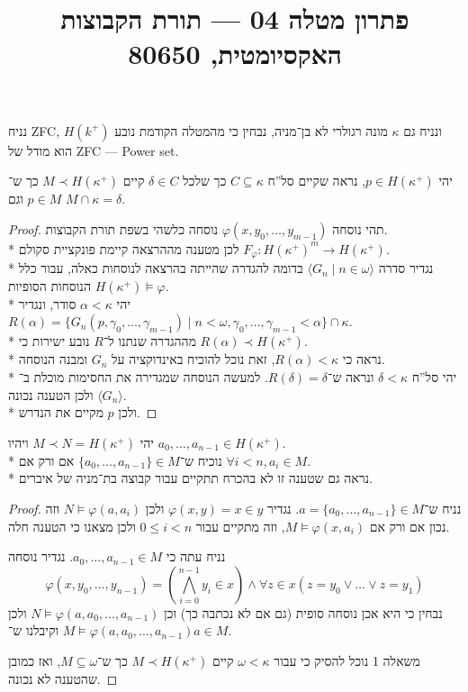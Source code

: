 
\title{פתרון מטלה 04 --- תורת הקבוצות האקסיומטית, 80650}

\DeclareMathOperator{\trcl}{trcl}
\DeclareMathOperator{\rank}{rank}


\maketitle
\maketitleprint{}

\question{}
נניח ZFC, ונניח גם $\kappa$ מונה רגולרי לא בן־מניה, נבחין כי מהמטלה הקודמת נובע $H(k^+)$ הוא מודל של ZFC --- Power set.

יהי $p \in H(\kappa^+)$, נראה שקיים סל''ח $C \subseteq \kappa$ כך שלכל $\delta \in C$ קיים $M \prec H(\kappa^+)$ כך ש־$p \in M$ וגם $M \cap \kappa = \delta$.
\begin{proof}
	תהי נוסחה $\varphi(x, y_0, \dots, y_{m - 1})$ נוסחה כלשהי בשפת תורת הקבוצות. \\*
	לכן מטענה מההרצאה קיימת פונקציית סקולם $F_\varphi : {H(\kappa^+)}^m \to H(\kappa^+)$. \\*
	נגדיר סדרה $\langle G_n \mid n \in \omega\rangle$ בדומה להגדרה שהייתה בהרצאה לנוסחות כאלה, עבור כלל הנוסחות הסופיות $H(\kappa^+) \models \varphi$. \\*
	יהי $\alpha < \kappa$ סודר, ונגדיר $R(\alpha) = \{ G_n(p, \gamma_0, \dots, \gamma_{m - 1}) \mid n < \omega, \gamma_0, \dots, \gamma_{m - 1} < \alpha\} \cap \kappa$. \\*
	מההגדרה שנתנו ל־$R$ נובע ישירות כי $R(\alpha) \prec H(\kappa^+)$. \\*
	נראה כי $R(\alpha) < \kappa$, זאת נוכל להוכיח באינדוקציה על $G_n$ ומבנה הנוסחה. \\*
	יהי סל''ח $\delta < \kappa$ ונראה ש־$R(\delta) = \delta$. למעשה הנוסחה שמגדירה את החסימות מוכלת ב־$\langle G_n \rangle$ ולכן הטענה נכונה. \\*
	ולכן $p$ מקיים את הנדרש.
\end{proof}

\question{}
יהי $M \prec N = H(\kappa^+)$ ויהיו $a_0, \dots, a_{n - 1} \in H(\kappa^+)$. \\*
נוכיח ש־$\{a_0, \dots, a_{n - 1}\} \in M$ אם ורק אם $\forall i < n, a_i \in M$. \\*
נראה גם שטענה זו לא בהכרח תתקיים עבור קבוצה בת־מניה של איברים.
\begin{proof}
	נניח ש־$a = \{a_0, \dots, a_{n - 1}\} \in M$.
	נגדיר $\varphi(x, y) = x \in y$ ולכן $N \models \varphi(a, a_i)$ וזה נכון אם ורק אם $M \models \varphi(x, a_i)$, וזה מתקיים עבור $0 \le i < n$ ולכן מצאנו כי הטענה חלה.

	נניח עתה כי $a_0, \dots, a_{n - 1} \in M$.
	נגדיר נוסחה
	\[
		\varphi(x, y_0, \dots, y_{n - 1})
		= \left(\bigwedge_{i = 0}^{n - 1} y_i \in x\right) \land \forall z \in x (z = y_0 \lor \dots \lor z = y_1)
	\]
	נבחין כי היא אכן נוסחה סופית (גם אם לא נכתבה כך) וכן $N \models \varphi(a, a_0, \dots, a_{n - 1})$ ולכן $M \models \varphi(a, a_0, \dots, a_{n - 1})$ וקיבלנו ש־$a \in M$.

	משאלה 1 נוכל להסיק כי עבור $\omega < \kappa$ קיים $M \prec H(\kappa^+)$ כך ש־$M \subseteq \omega$, ואז כמובן שהטענה לא נכונה.
\end{proof}

